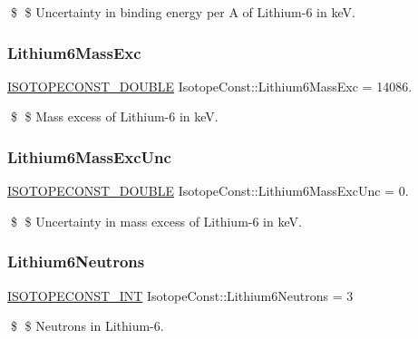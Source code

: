 \$ \$ Uncertainty in binding energy per A of Lithium-\/6 in keV. \mbox{\label{group___isotope_const-_lithium-_li6_gaad7bbc1e07caef7d5bbc0472258579e0}} 
\subsubsection{\texorpdfstring{Lithium6\+Mass\+Exc}{Lithium6MassExc}}
{\footnotesize\ttfamily \mbox{\hyperlink{group___isotope_const-_macros_ga8f45a7272ce02c0b4c65c44636ed719a}{I\+S\+O\+T\+O\+P\+E\+C\+O\+N\+S\+T\+\_\+\+D\+O\+U\+B\+LE}} Isotope\+Const\+::\+Lithium6\+Mass\+Exc = 14086.}

\$ \$ Mass excess of Lithium-\/6 in keV. \mbox{\label{group___isotope_const-_lithium-_li6_gafb5a9c92c988a7004a97a9b101c7b5c5}} 
\subsubsection{\texorpdfstring{Lithium6\+Mass\+Exc\+Unc}{Lithium6MassExcUnc}}
{\footnotesize\ttfamily \mbox{\hyperlink{group___isotope_const-_macros_ga8f45a7272ce02c0b4c65c44636ed719a}{I\+S\+O\+T\+O\+P\+E\+C\+O\+N\+S\+T\+\_\+\+D\+O\+U\+B\+LE}} Isotope\+Const\+::\+Lithium6\+Mass\+Exc\+Unc = 0.}

\$ \$ Uncertainty in mass excess of Lithium-\/6 in keV. \mbox{\label{group___isotope_const-_lithium-_li6_ga36a4fc1a617d2cddd8fd9601546ae388}} 
\subsubsection{\texorpdfstring{Lithium6\+Neutrons}{Lithium6Neutrons}}
{\footnotesize\ttfamily \mbox{\hyperlink{group___isotope_const-_macros_ga5f18360b3e99483a35c32d789e62621c}{I\+S\+O\+T\+O\+P\+E\+C\+O\+N\+S\+T\+\_\+\+I\+NT}} Isotope\+Const\+::\+Lithium6\+Neutrons = 3}

\$ \$ Neutrons in Lithium-\/6. \mbox{\label{group___isotope_const-_lithium-_li6_gad3c308389e583ba6131c55ac987900e6}} 
